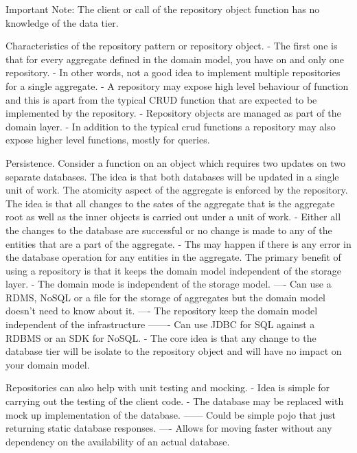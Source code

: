 Important Note: The client or call of the repository object function has no knowledge of the data tier.

Characteristics of the repository pattern or repository object.
- The first one is that for every aggregate defined in the domain model, you have on and only one repository.
- In other words, not a good idea to implement multiple repositories for a single aggregate.
- A repository may expose high level behaviour of function and this is apart from the typical CRUD function that are expected to be implemented by the repository.
- Repository objects are managed as part of the domain layer.
- In addition to the typical crud functions a repository may also expose higher level functions, mostly for queries.


Persistence.
Consider a function on an object which requires two updates on two separate databases.
The idea is that both databases will be updated in a single unit of work.
The atomicity aspect of the aggregate is enforced by the repository.
The idea is that all changes to the sates of the aggregate that is the aggregate root as well as the inner objects is carried out under a unit of work.
- Either all the changes to the database are successful or no change is made to any of the entities that are a part of the aggregate.
- Ths may happen if there is any error in the database operation for any entities in the aggregate.
The primary benefit of using a repository is that it keeps the domain model independent of the storage layer.
- The domain mode is independent of the storage model.
---- Can use a RDMS, NoSQL or a file for the storage of aggregates but the domain model doesn't need to know about it.
---- The repository keep the domain model independent of the infrastructure
------- Can use JDBC for SQL against a RDBMS or an SDK for NoSQL.
- The core idea is that any change to the database tier will be isolate to the repository object and will have no impact on your domain model.

Repositories can also help with unit testing and mocking.
- Idea is simple for carrying out the testing of the client code.
- The database may be replaced with mock up implementation of the database.
------ Could be simple pojo that just returning static database responses.
---- Allows for moving faster without any dependency on the availability of an actual database.

